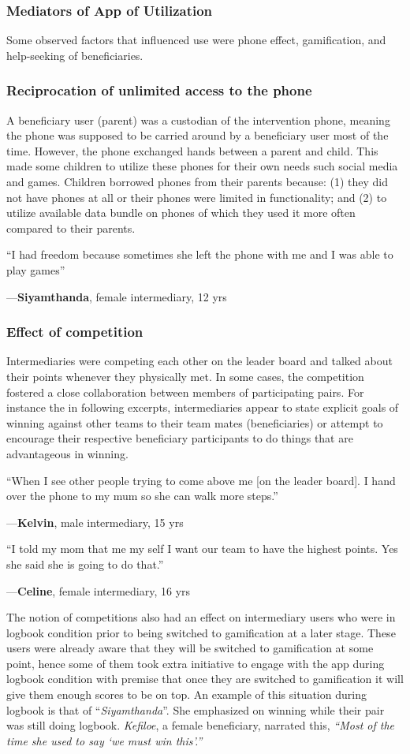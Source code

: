 \documentclass{sig-alternate}
\newenvironment{myquote}
               {\list{}{\rightmargin   \leftmargin
                        \parsep        0in }%
                \item\relax}
               {\endlist}
\newcommand{\userquote}[2]{\begin{samepage}\begin{myquote} 
     \em{\small{#2\begin{flushright}---#1\end{flushright}}}
   \end{myquote}\end{samepage}}
\begin{document}
\subsubsection{Mediators of App of Utilization}
Some observed factors that influenced use were phone effect, gamification, and help-seeking of beneficiaries.
\subsubsection*{\textbf{Reciprocation of unlimited access to the phone}}
A beneficiary user (parent) was a custodian of the intervention phone, meaning the phone was supposed to be carried around by a beneficiary user most of the time. However, the phone exchanged hands between a parent and child. This made some children to utilize these phones for their own needs such social media and games. Children borrowed phones from their parents because: (1) they did not have phones at all or their phones were limited in functionality; and (2) to utilize available data bundle on phones of which they used it more often compared to their parents.

\userquote{\textbf{Siyamthanda}, female intermediary, 12 yrs} {``I had freedom because sometimes she left the phone with me and I was able to play games''}

\subsubsection*{\textbf{Effect of competition}}
Intermediaries were competing each other on the leader board and talked about their points whenever they physically met. In some cases, the competition fostered a close collaboration between members of participating pairs. For instance the in following excerpts, intermediaries appear to state explicit goals of winning against other teams to their team mates (beneficiaries) or attempt to encourage their respective beneficiary participants to do things that are advantageous in winning.

\userquote{\textbf{Kelvin}, male intermediary, 15 yrs} {``When I see other people trying to come above me [on the leader board]. I hand over the phone to my mum so she can walk more steps.''} 

\userquote{\textbf{Celine}, female intermediary, 16 yrs} {``I told my mom that me my self I want our team to have the highest points. Yes she said she is going to do that.''} 

The notion of competitions also had an effect on intermediary users who were in logbook condition prior to being switched to gamification at a later stage. These users were already aware that they will be switched to gamification at some point, hence some of them took extra initiative to engage with the app during logbook condition with premise that once they are switched to gamification it will give them enough scores to be on top. An example of this situation during logbook is that of ``\emph{Siyamthanda}''. She emphasized on winning while their pair was still doing logbook. \emph{Kefiloe}, a female beneficiary, narrated this, \emph{``Most of the time she used to say `we must win this'.''} 
\end{document}
